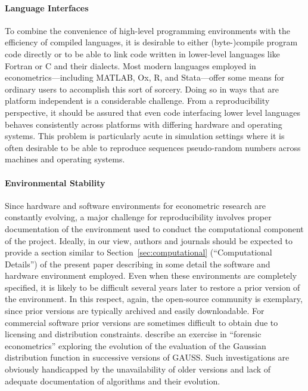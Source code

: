 \documentclass[10pt,a4paper,twoside]{article}
\let\proglang=\textsf
\begin{document}
\paragraph{Language Interfaces}
To combine the convenience of high-level programming environments with 
the efficiency of compiled languages, it is desirable to either (byte-)compile
program code directly or to be able to link code written in lower-level
languages like \proglang{Fortran} or \proglang{C} and their dialects.
Most modern languages employed in econometrics---including \proglang{MATLAB},
\proglang{Ox}, \proglang{R}, and \proglang{Stata}---offer some means
for ordinary users to accomplish this sort of sorcery. Doing so in ways that
are platform independent is a considerable challenge. From a reproducibility
perspective, it should be assured that even code interfacing lower level languages
behaves consistently across platforms with differing hardware and operating systems.
This problem is particularly acute in simulation settings where it is often
desirable to be able to reproduce sequences pseudo-random numbers across machines
and operating systems. 
 
\paragraph{Environmental Stability}
Since hardware and software environments for econometric research are constantly
evolving, a major challenge for reproducibility involves proper documentation of 
the environment used to conduct the computational component of the project.  Ideally,
in our view, authors and journals should be expected to provide a section similar to
Section~\ref{sec:computational} (``Computational Details'') of the present paper
describing in some detail the software and hardware environment employed. 
Even when these environments are completely specified, it is likely to be difficult
several years later to restore
a prior version of the environment.  In this respect, again, the open-source
community is exemplary, since prior versions are typically archived and easily
downloadable. For commercial software prior versions are sometimes difficult to obtain due to
licensing and distribution constraints. 
\cite{repro:Zeileis+Kleiber:2005} describe 
an exercise in ``forensic econometrics'' exploring the evolution of the evaluation
of the Gaussian distribution function in successive versions of
\proglang{GAUSS}. 
Such investigations are obviously handicapped by the unavailability of older versions
and lack of adequate documentation of algorithms and their evolution.
\end{document}
